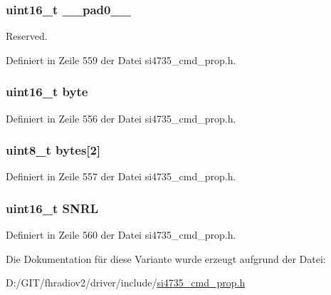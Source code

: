 \subsubsection[{\+\_\+\+\_\+pad0\+\_\+\+\_\+}]{\setlength{\rightskip}{0pt plus 5cm}uint16\+\_\+t \+\_\+\+\_\+pad0\+\_\+\+\_\+}\label{unionfm__rsq__snr__lo__thres_a77132c2c26a75f5b8751b235cda23828}


Reserved. 



Definiert in Zeile 559 der Datei si4735\+\_\+cmd\+\_\+prop.\+h.

\hypertarget{unionfm__rsq__snr__lo__thres_ab0549c1b5ea980a02e7eab77e21fea49}{}
\subsubsection[{byte}]{\setlength{\rightskip}{0pt plus 5cm}uint16\+\_\+t byte}\label{unionfm__rsq__snr__lo__thres_ab0549c1b5ea980a02e7eab77e21fea49}


Definiert in Zeile 556 der Datei si4735\+\_\+cmd\+\_\+prop.\+h.

\hypertarget{unionfm__rsq__snr__lo__thres_a46e4c05d20a047ec169f60d3167e912e}{}
\subsubsection[{bytes}]{\setlength{\rightskip}{0pt plus 5cm}uint8\+\_\+t bytes\mbox{[}2\mbox{]}}\label{unionfm__rsq__snr__lo__thres_a46e4c05d20a047ec169f60d3167e912e}


Definiert in Zeile 557 der Datei si4735\+\_\+cmd\+\_\+prop.\+h.

\hypertarget{unionfm__rsq__snr__lo__thres_a78a9e0c1e70e64406ad160b491c6a7de}{}
\subsubsection[{S\+N\+R\+L}]{\setlength{\rightskip}{0pt plus 5cm}uint16\+\_\+t S\+N\+R\+L}\label{unionfm__rsq__snr__lo__thres_a78a9e0c1e70e64406ad160b491c6a7de}


Definiert in Zeile 560 der Datei si4735\+\_\+cmd\+\_\+prop.\+h.



Die Dokumentation für diese Variante wurde erzeugt aufgrund der Datei\+:\begin{DoxyCompactItemize}
\item 
D\+:/\+G\+I\+T/fhradiov2/driver/include/\hyperlink{si4735__cmd__prop_8h}{si4735\+\_\+cmd\+\_\+prop.\+h}\end{DoxyCompactItemize}
